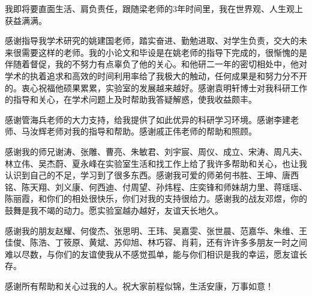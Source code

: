 \begin{thanks}
我即将要直面生活、肩负责任，跟随梁老师的3年时间里，我在世界观、人生观上获益满满。

感谢指导我学术研究的姚建国老师，踏实奋进、勤勉进取、对学生负责，交大的未来很需要这样的老师。我的小论文和毕设是在姚老师的指导下完成的，很惭愧的是伴随着督促，我的不努力有点辜负了他的关心。和他研二一年的密切相处中，他对学术的执着追求和高效的时间利用率给了我极大的触动，任何成果是和努力分不开的。衷心祝福他硕果累累，实验室的发展越来越好。感谢袁明轩博士对我科研工作的指导和关心，在学术问题上及时帮助我答疑解惑，使我收益颇丰。

感谢管海兵老师的大力支持，给我提供了如此优异的科研学习环境。感谢李建老师、马汝辉老师对我的指导和帮助。感谢戚正伟老师的帮助和照顾。

感谢我的师兄谢涛、张雕、曹亮、朱敏君、刘宇宸、周仪、成立、宋涛、周凡夫、林立伟、吴杰蔚、夏永峰在实验室生活和找工作上给了我许多帮助和关心，也让我认识到自己的不足，学习到了很多东西。感谢我可爱的师弟何书胜、王坤、唐西铭、陈天翔、刘义康、何西迪、付周望、孙炜程、庄奕锋和师妹胡力里、蒋瑶瑶、陈丽霞，和你们的相处很快乐，你们对我的支持很给力。感谢我的战友邓煜，你的鼓舞是我不竭的动力。愿实验室越办越好，友谊天长地久。

感谢我的朋友赵耀、何俊杰、张思明、王玮、吴嘉雯、张世晨、范嘉华、朱维、王佳俊、陈浩、丁筱原、黄斌、苏仰旭、林巧容、肖莉，还有许许多多朋友一时之间难以尽数，与你们的友谊使我从不感觉孤单，能与你们相识是我的幸运，愿友谊长存。

感谢所有帮助和关心过我的人。祝大家前程似锦，生活安康，万事如意！



\end{thanks}
